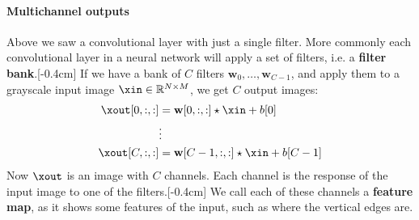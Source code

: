 \paragraph*{Multichannel outputs}
Above we saw a convolutional layer with just a single filter. More commonly each convolutional layer in a neural network will apply a set of filters, i.e. a \textbf{filter bank}.[-0.4cm] If we have a bank of $C$ filters $\mathbf{w}_0, \ldots, \mathbf{w}_{C-1}$, and apply them to a grayscale input image $\xin \in \mathbb{R}^{N \times M}$, we get $C$ output images:
\begin{align}
    \xout[0,:,:] & = \mathbf{w}[0,:,:] \star \xin + b[0]     \\
                 & \vdots \nonumber                          \\
    \xout[C,:,:] & = \mathbf{w}[C-1,:,:] \star \xin + b[C-1]
    \label{eqn:convolutional_neural_nets:convolutional_layer_filter_bank}
\end{align}
Now $\xout$ is an image with $C$ channels. Each channel is the response of the input image to one of the filters.[-0.4cm] We call each of these channels a \textbf{feature map}, as it shows some features of the input, such as where the vertical edges are.

